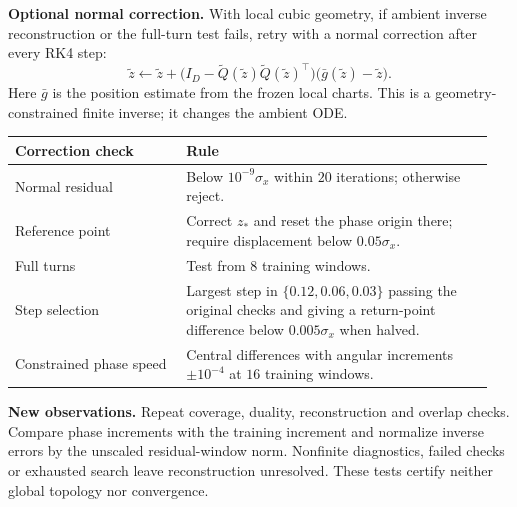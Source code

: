 \documentclass[11pt,a4paper]{article}
\begin{document}
\textbf{Optional normal correction.}
With local cubic geometry, if ambient inverse reconstruction or the
full-turn test fails, retry with a normal correction after every RK4 step:
\[
\widetilde z\leftarrow\widetilde z+
\bigl(I_D-\widetilde Q(\widetilde z)\widetilde Q(\widetilde z)^\top\bigr)
\bigl(\bar g(\widetilde z)-\widetilde z\bigr).
\]
Here $\bar g$ is the position estimate from the frozen local charts.
This is a geometry-constrained finite inverse; it changes the ambient ODE.
\begin{center}
\begin{tabular}{@{}p{0.34\linewidth}p{0.61\linewidth}@{}}
\toprule
Correction check & Rule\\
\midrule
Normal residual & Below $10^{-9}\sigma_x$ within $20$ iterations;
otherwise reject.\\
Reference point & Correct $z_*$ and reset the phase origin there;
require displacement below $0.05\sigma_x$.\\
Full turns & Test from $8$ training windows.\\
Step selection & Largest step in $\{0.12,0.06,0.03\}$ passing the original
checks and giving a return-point difference below $0.005\sigma_x$
when halved.\\
Constrained phase speed & Central differences with angular increments
$\pm10^{-4}$ at $16$ training windows.\\
\bottomrule
\end{tabular}
\end{center}

\textbf{New observations.}
Repeat coverage, duality, reconstruction and overlap checks. Compare
phase increments with the training increment and normalize inverse errors
by the unscaled residual-window norm. Nonfinite diagnostics, failed checks
or exhausted search leave reconstruction unresolved. These tests certify
neither global topology nor convergence.
\end{document}
